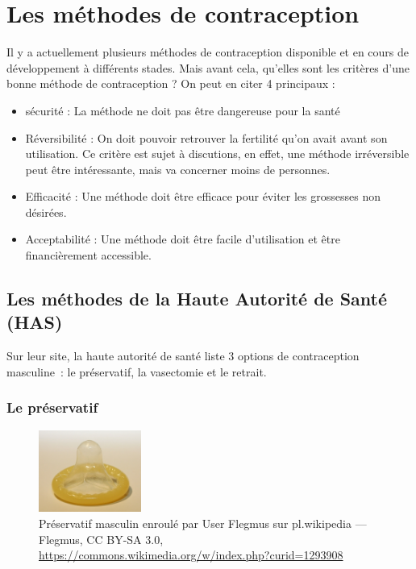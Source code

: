 \documentclass[12pt,a4paper]{report}
\begin{document}
\chapter{Les méthodes de contraception}

Il y a actuellement plusieurs méthodes de contraception disponible et en cours de développement à différents stades. Mais avant cela, qu'elles sont les critères d'une bonne méthode de contraception ?
On peut en citer 4 principaux :
\begin{itemize}
    \item sécurité : La méthode ne doit pas être dangereuse pour la santé
    \item Réversibilité : On doit pouvoir retrouver la fertilité qu'on avait avant son utilisation. Ce critère est sujet à discutions, en effet, une méthode irréversible peut être intéressante, mais va concerner moins de personnes.
    \item Efficacité : Une méthode doit être efficace pour éviter les grossesses non désirées.
    \item Acceptabilité : Une méthode doit être facile d'utilisation et être financièrement accessible. \cite{mieussetPotentialMildTesticular1994}
\end{itemize}

\section{Les méthodes de la Haute Autorité de Santé (HAS)}
Sur leur site, la haute autorité de santé liste 3 options de contraception masculine : le préservatif, la vasectomie et le retrait. \cite{ContraceptionChezHomme2019}

\subsection{Le préservatif}

\begin{figure}[h]
    \centering
    \includegraphics[width=0.3\textwidth]{images/scientiphique/Kondom.jpg}
    \caption{Préservatif masculin enroulé par User Flegmus sur pl.wikipedia — Flegmus, CC BY-SA 3.0, \href{https://commons.wikimedia.org/w/index.php?curid=1293908}{https://commons.wikimedia.org/w/index.php?curid=1293908}}
    \label{fig:preservatif}
\end{figure}
\end{document}
